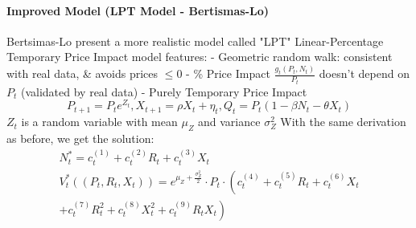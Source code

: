 \documentclass[11pt]{article}
\begin{document}
\paragraph*{Improved Model (LPT Model - Bertismas-Lo)}
Bertsimas-Lo present a more realistic model called "LPT" Linear-Percentage Temporary Price Impact model features:
- Geometric random walk: consistent with real data, \& avoids prices $\leq 0$
- \% Price Impact $\frac{g_t\left(P_t, N_t\right)}{P_t}$ doesn't depend on $P_t$ (validated by real data)
- Purely Temporary Price Impact
$$
P_{t+1}=P_t e^{Z_t}, X_{t+1}=\rho X_t+\eta_t, Q_t=P_t\left(1-\beta N_t-\theta X_t\right)
$$
$Z_t$ is a random variable with mean $\mu_Z$ and variance $\sigma_Z^2$
With the same derivation as before, we get the solution:
$$
\begin{gathered}
N_t^*=c_t^{(1)}+c_t^{(2)} R_t+c_t^{(3)} X_t \\
V_t^*\left(\left(P_t, R_t, X_t\right)\right)=e^{\mu_Z+\frac{\sigma_Z^2}{2}} \cdot P_t \cdot\left(c_t^{(4)}+c_t^{(5)} R_t+c_t^{(6)} X_t\right. \\
\left.+c_t^{(7)} R_t^2+c_t^{(8)} X_t^2+c_t^{(9)} R_t X_t\right)
\end{gathered}
$$
\end{document}

